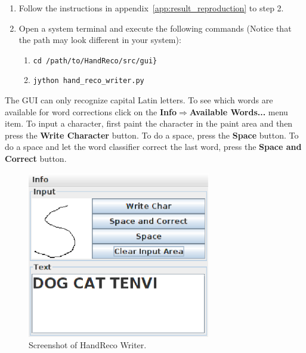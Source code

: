 \begin{enumerate}
 \item Follow the instructions in appendix~\ref{app:result_reproduction} to step 2.
 \item Open a system terminal and execute the following commands (Notice that the path may look different in your system):
 \begin{enumerate}
  \item \verb|cd /path/to/HandReco/src/gui}|
  \item \verb|jython hand_reco_writer.py|
 \end{enumerate}
\end{enumerate}

The GUI can only recognize capital Latin letters. To see which words are available for word corrections click on the \textbf{Info$\Rightarrow$Available Words...} menu item. To input a character, first paint the character in the paint area and then press the \textbf{Write Character} button. To do a space, press the \textbf{Space} button. To do a space and let the word classifier correct the last word, press the \textbf{Space and Correct} button.

    \begin{figure}[htb] 
      \begin{center}
	\leavevmode
	\includegraphics[width=80mm]{Screenshot_HandReco_Writer.eps}%
      \end{center}
      \caption{Screenshot of HandReco Writer.}
      \label{fig:hand_reco_writer_screenshot}
    \end{figure}
